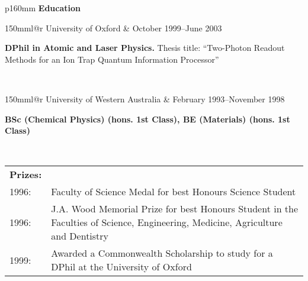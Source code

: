 \documentclass[10pt,a4paper]{article}
\makeatletter
\newcommand{\role}[6]{
\begin{tabular*}{150mm}{l@{\extracolsep{\fill}}r}
#5 & #1--#2 \\ 
\multicolumn{2}{p{145mm}}
{\textbf{#3}#4

{\small #6}} 
\end{tabular*}
\vspace{2mm}
 }
\makeatother
\begin{document}
\vspace{0.1in}
\begin{tabular}{p{160mm}}
  {\large \textbf{Education}}\\
  \hline
  \role{October 1999}{June 2003} 
     {DPhil in Atomic and Laser Physics.}{ Thesis title: 
     ``Two-Photon Readout Methods for an Ion Trap Quantum Information
     Processor''}
     {University of Oxford}{} \\
  \role{February 1993}{November 1998}
      {BSc (Chemical Physics) (hons. 1st Class),
       BE (Materials) (hons. 1st Class)}{}
      {University of Western Australia}{}
    \\
    \begin{tabular}{p{20mm}p{125mm}}
      \textbf{Prizes:}\\
        1996: & Faculty of Science Medal for best Honours Science
        Student\\
        1996: & J.A. Wood Memorial Prize for best Honours Student in 
        the Faculties of Science, Engineering, Medicine, Agriculture
        and Dentistry\\
         1999: & Awarded a Commonwealth Scholarship to study for a DPhil at the University of Oxford
    \end{tabular}
\end{tabular} \\
\vspace{0.1in}
\end{document}
